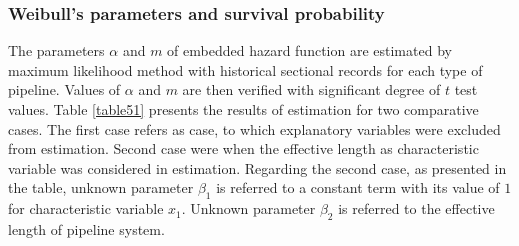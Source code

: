 \subsubsection{Weibull's parameters and survival probability}
\label{5821}
The parameters $\alpha$ and $m$ of embedded hazard function are estimated by maximum likelihood method with historical sectional records for each type of pipeline. Values of $\alpha$ and $m$ are then verified with significant degree of $t$ test values. Table \ref{table51} presents the results of estimation for two comparative cases. The first case refers as case, to which explanatory variables were excluded from estimation. Second case were when the effective length as characteristic variable was considered in estimation. Regarding the second case, as presented in the table, unknown parameter $\beta_1$ is referred to a constant term with its value of $1$ for characteristic variable $x_1$. Unknown parameter $\beta_2$ is referred to the effective length of pipeline system. 

